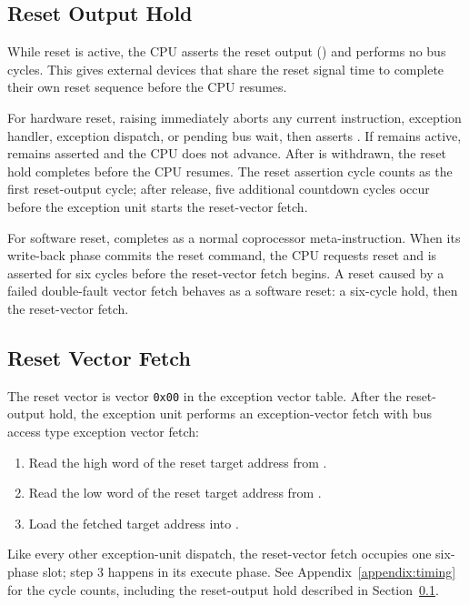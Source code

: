 \subsection{Reset Output Hold}
\label{sec:reset-output-hold}

While reset is active, the CPU asserts the reset output () and performs no bus cycles. This gives
external devices that share the reset signal time to complete their own reset sequence before the CPU resumes.

For hardware reset, raising  immediately aborts any current instruction, exception handler, exception
dispatch, or pending bus wait, then asserts . If  remains active, 
remains asserted and the CPU does not advance. After  is withdrawn, the reset hold completes before the
CPU resumes. The reset assertion cycle counts as the first reset-output cycle; after release, five additional countdown
cycles occur before the exception unit starts the reset-vector fetch.

For software reset,  completes as a normal coprocessor meta-instruction. When its write-back phase
commits the reset command, the CPU requests reset and  is asserted for six cycles before the
reset-vector fetch begins. A reset caused by a failed double-fault vector fetch behaves as a software reset: a
six-cycle  hold, then the reset-vector fetch.

\subsection{Reset Vector Fetch}
\label{sec:reset-vector-fetch}

The reset vector is vector \texttt{0x00} in the exception vector table. After the reset-output hold, the exception unit
performs an exception-vector fetch with bus access type exception vector fetch:

\begin{enumerate}
	\item Read the high word of the reset target address from .
	\item Read the low word of the reset target address from .
	\item Load the fetched target address into .
\end{enumerate}

Like every other exception-unit dispatch, the reset-vector fetch occupies one six-phase slot; step 3 happens in its
execute phase. See Appendix~\ref{appendix:timing} for the cycle counts, including the reset-output hold described in
Section~\ref{sec:reset-output-hold}.

